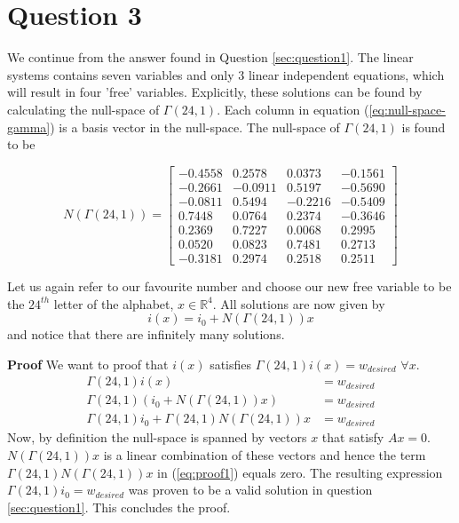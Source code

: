 \documentclass[a4paper,10pt]{article}
\begin{document}
\section{Question 3} \label{sec:question3}
We continue from the answer found in Question \ref{sec:question1}. The linear systems contains seven variables and only 3 linear independent equations, which will result in four 'free' variables. Explicitly, these solutions can be found by calculating the null-space of $\Gamma(24,1)$. Each column in equation (\ref{eq:null-space-gamma}) is a basis vector in the null-space. The null-space of $\Gamma(24,1)$ is found to be

\begin{equation} \label{eq:null-space-gamma}
N(\Gamma(24,1))=
\begin{bmatrix}
   -0.4558 &   0.2578 &   0.0373 &  -0.1561\\
   -0.2661 &  -0.0911 &   0.5197 &  -0.5690\\
   -0.0811 &   0.5494 &  -0.2216 &  -0.5409\\
    0.7448 &   0.0764 &   0.2374 &  -0.3646\\
    0.2369 &   0.7227 &   0.0068 &   0.2995\\
    0.0520 &   0.0823 &   0.7481 &   0.2713\\
   -0.3181 &   0.2974 &   0.2518 &   0.2511
\end{bmatrix}
\end{equation}

Let us again refer to our favourite number and choose our new free variable to be the $24^{th}$ letter of the alphabet, $x\in \mathbb{R}^4$. All solutions are now given by
\begin{equation} \label{eq:allsolutions}
    i(x) = i_0 + N(\Gamma(24,1))x
\end{equation}
and notice that there are infinitely many solutions. 

\noindent \textbf{Proof}
We want to proof that $i(x)$ satisfies $\Gamma(24,1)i(x) = w_{desired}$ \hspace{1ex} $\forall x$. 
\begin{align}
    \Gamma(24,1)i(x) &= w_{desired} \\
    \Gamma(24,1)(i_0 + N(\Gamma(24,1))x) &= w_{desired} \\
    \Gamma(24,1)i_0 + \Gamma(24,1)N(\Gamma(24,1))x &= w_{desired} \label{eq:proof1}
\end{align}
Now, by definition the null-space is spanned by vectors $x$ that satisfy $Ax=0$. $N(\Gamma(24,1))x$ is a linear combination of these vectors and hence the term $\Gamma(24,1)N(\Gamma(24,1))x$ in (\ref{eq:proof1}) equals zero. The resulting expression $\Gamma(24,1)i_0= w_{desired}$ was proven to be a valid solution in question \ref{sec:question1}. This concludes the proof.
\end{document}
